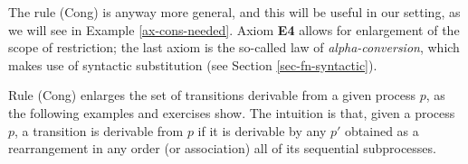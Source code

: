 The rule (Cong) is anyway more general, and this will be useful in our setting, as we will see in 
Example \ref{ax-cons-needed}.
Axiom {\bf E4} allows for enlargement of the scope of restriction;
the last axiom is the so-called law of {\em alpha-conversion}, which makes use of syntactic 
substitution (see Section \ref{sec-fn-syntactic}). 

Rule (Cong) enlarges the set of transitions derivable from a given process $p$, as the following 
examples and exercises show. The intuition is that, given a process $p$, a transition is derivable from $p$
if it is derivable by any $p'$ obtained as a rearrangement in any order (or association) all of its 
sequential subprocesses.


